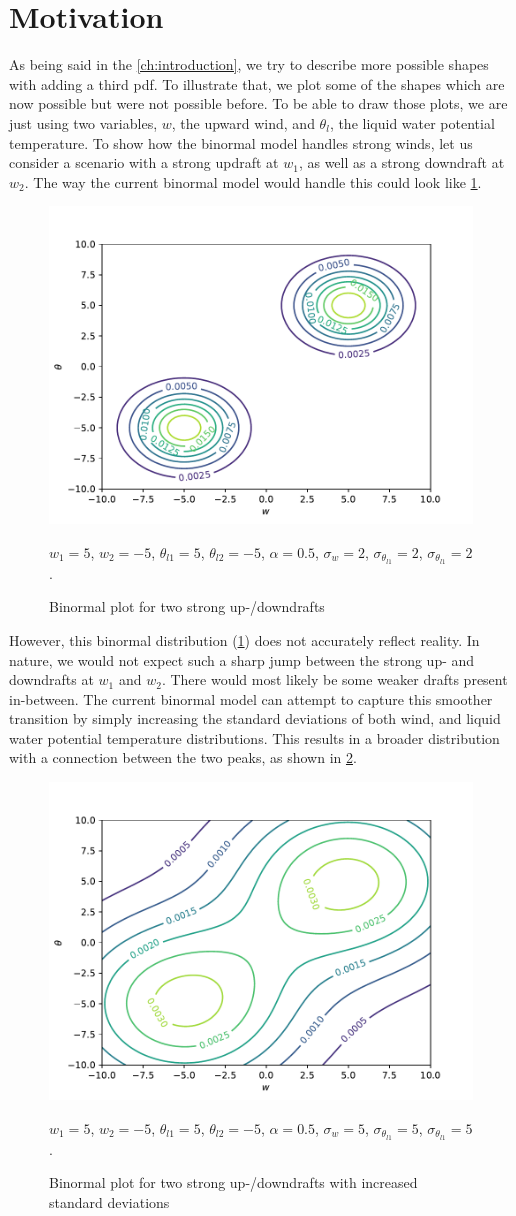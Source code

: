 \section{Motivation}\label{sec:motivation}

As being said in the \cref{ch:introduction},
we try to describe more possible shapes with adding a third \gls{pdf}.
To illustrate that, we plot some of the shapes which are now possible but were not possible before.
To be able to draw those plots, we are just using two variables, $w$, the upward wind,
and $\theta_l$, the liquid water potential temperature.
To show how the binormal model handles strong winds,
let us consider a scenario with a strong updraft at $w_1$, as well as a strong downdraft at $w_2$.
The way the current binormal model would handle this could look like \cref{fig:plot1}.
\begin{figure}[!htb]
    \centering
    \includegraphics[width=.48\textwidth]{include/figures/plot1}
    \caption{Binormal plot for two strong up-/downdrafts}
    \label{fig:plot1}
    $w_1 = 5$, $w_2 = -5$, $\theta_{l1} = 5$, $\theta_{l2} = -5$,
    $\alpha = 0.5$, $\sigma_w = 2$, $\sigma_{\theta_{l1}} = 2$, $\sigma_{\theta_{l1}} = 2$.
\end{figure}
However, this binormal distribution (\cref{fig:plot1}) does not accurately reflect reality.
In nature, we would not expect such a sharp jump between the strong up- and downdrafts at $w_1$ and $w_2$.
There would most likely be some weaker drafts present in-between.
The current binormal model can attempt to capture this smoother transition
by simply increasing the standard deviations of both wind,
and liquid water potential temperature distributions.
This results in a broader distribution with a connection between the two peaks,
as shown in \cref{fig:plot2}.
\begin{figure}[!htb]
    \centering
    \includegraphics[width=.5\textwidth]{include/figures/plot2}
    \caption{Binormal plot for two strong up-/downdrafts with increased standard deviations}
    \label{fig:plot2}
    $w_1 = 5$, $w_2 = -5$, $\theta_{l1} = 5$, $\theta_{l2} = -5$,
    $\alpha = 0.5$, $\sigma_w = 5$, $\sigma_{\theta_{l1}} = 5$, $\sigma_{\theta_{l1}} = 5$.
\end{figure}
